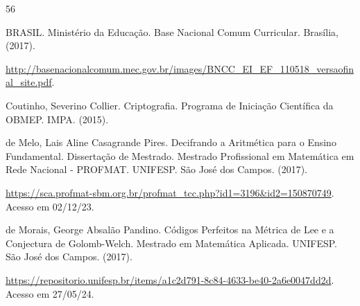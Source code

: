 \documentclass[oneside,a4paper,12pt]{book}
\theoremstyle{plain}
\begin{document}
\begin{thebibliography}{56}



 BRASIL. Ministério da Educação. Base Nacional Comum Curricular. Brasília,  (2017).

\url{http://basenacionalcomum.mec.gov.br/images/BNCC_EI_EF_110518_versaofinal_site.pdf}.

  Coutinho, Severino Collier. Criptografia. Programa de Iniciação Científica da OBMEP. IMPA. (2015).








 de Melo, Lais Aline Casagrande Pires. Decifrando a Aritmética para o Ensino Fundamental. Dissertação de Mestrado. Mestrado Profissional em Matemática em Rede Nacional - PROFMAT. UNIFESP. São José dos Campos. (2017).

\url{https://sca.profmat-sbm.org.br/profmat_tcc.php?id1=3196&id2=150870749}. Acesso em 02/12/23.

 de Morais, George Absalão Pandino. Códigos Perfeitos na Métrica de Lee e a Conjectura de Golomb-Welch. Mestrado em Matemática Aplicada. UNIFESP. São José dos Campos. (2017).

\url{https://repositorio.unifesp.br/items/a1c2d791-8c84-4633-be40-2a6e0047dd2d}. Acesso em 27/05/24.




\end{thebibliography}
\end{document}
